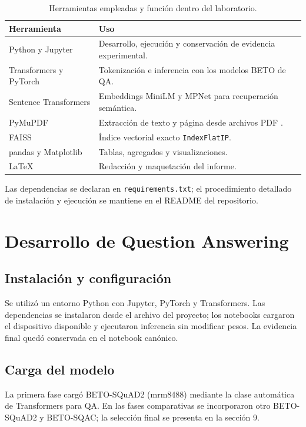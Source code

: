 \documentclass[12pt,letterpaper]{article}
\begin{document}
\begin{table}[!htbp]
\centering
\small
\caption{Herramientas empleadas y función dentro del laboratorio.}
\begin{tabularx}{\linewidth}{@{}lY@{}}
\toprule
\textbf{Herramienta} & \textbf{Uso}\\
\midrule
Python y Jupyter & Desarrollo, ejecución y conservación de evidencia experimental.\\
Transformers y PyTorch & Tokenización e inferencia con los modelos BETO de QA.\\
Sentence Transformers & Embeddings MiniLM y MPNet para recuperación semántica.\\
PyMuPDF & Extracción de texto y página desde archivos PDF \cite{pymupdfdocs}.\\
FAISS & Índice vectorial exacto \texttt{IndexFlatIP}.\\
pandas y Matplotlib & Tablas, agregados y visualizaciones.\\
LaTeX & Redacción y maquetación del informe.\\
\bottomrule
\end{tabularx}
\end{table}

Las dependencias se declaran en \texttt{requirements.txt}; el procedimiento
detallado de instalación y ejecución se mantiene en el README del repositorio.

\section{Desarrollo de Question Answering}

\subsection{Instalación y configuración}

Se utilizó un entorno Python con Jupyter, PyTorch y Transformers. Las
dependencias se instalaron desde el archivo del proyecto; los notebooks
cargaron el dispositivo disponible y ejecutaron inferencia sin modificar
pesos. La evidencia final quedó conservada en el notebook canónico.

\subsection{Carga del modelo}

La primera fase cargó BETO-SQuAD2 (mrm8488) mediante la clase automática de
Transformers para QA. En las fases comparativas se incorporaron otro
BETO-SQuAD2 y BETO-SQAC; la selección final se presenta en la sección 9.
\end{document}
